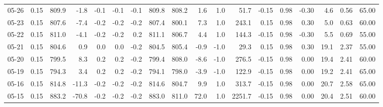 \begin{threeparttable}
{\begin{tabular}{lrrrrrrrrrrrrrrrrr}
  05-26 &     0.15 & 809.9 &              -1.8 &              -0.1 &               -0.1 &               -0.1 & 809.8 & 808.2 &        1.6 &                      1.0 &                51.7 &      -0.15 &      0.98 &          -0.30 &              4.6 &            0.56 &                  65.00 \\
  05-23 &     0.15 & 807.6 &              -7.4 &              -0.2 &               -0.2 &               -0.2 & 807.4 & 800.1 &        7.3 &                      1.0 &               243.1 &       0.15 &      0.98 &           0.30 &              5.0 &            0.63 &                  60.00 \\
  05-22 &     0.15 & 811.0 &              -4.1 &              -0.2 &               -0.2 &                0.2 & 811.1 & 806.7 &        4.4 &                      1.0 &               144.3 &      -0.15 &      0.98 &          -0.30 &              5.5 &            0.69 &                  55.00 \\
  05-21 &     0.15 & 804.6 &               0.9 &               0.0 &                0.0 &               -0.2 & 804.5 & 805.4 &       -0.9 &                     -1.0 &                29.3 &       0.15 &      0.98 &           0.30 &             19.1 &            2.37 &                  55.00 \\
  05-20 &     0.15 & 799.5 &               8.3 &               0.2 &                0.2 &               -0.2 & 799.4 & 808.0 &       -8.6 &                     -1.0 &               276.5 &      -0.15 &      0.98 &           0.00 &             19.4 &            2.41 &                  60.00 \\
  05-19 &     0.15 & 794.3 &               3.4 &               0.2 &                0.2 &               -0.2 & 794.1 & 798.0 &       -3.9 &                     -1.0 &               122.9 &      -0.15 &      0.98 &           0.00 &             19.2 &            2.41 &                  65.00 \\
  05-16 &     0.15 & 814.8 &             -11.3 &              -0.2 &               -0.2 &               -0.2 & 814.6 & 804.7 &        9.9 &                      1.0 &               313.7 &      -0.15 &      0.98 &           0.00 &             20.7 &            2.58 &                  65.00 \\
  05-15 &     0.15 & 883.2 &             -70.8 &              -0.2 &               -0.2 &               -0.2 & 883.0 & 811.0 &       72.0 &                      1.0 &              2251.7 &      -0.15 &      0.98 &           0.00 &             20.4 &            2.51 &                  60.00 \\

\end{tabular}}
\end{threeparttable}
